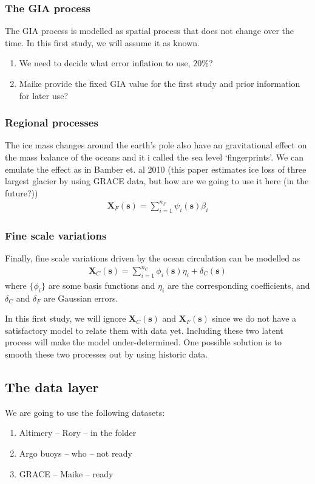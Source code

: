 \documentclass[cmbright,fleqn,referee]{envauth}
\newcommand{\bX}{\bm{X}}
\newcommand{\bs}{\bm{s}}
\begin{document}
\subsubsection{The GIA process}
The GIA process is modelled as spatial process that does not change over the time. In this first study, we will assume it as known. 
\begin{enumerate}
\item We need to decide what error inflation to use, $20\%$?
\item Maike provide the fixed GIA value for the first study and prior information for later use?
\end{enumerate}

\subsubsection{Regional processes}
The ice mass changes around the earth's pole also have an gravitational effect on the mass balance of the oceans and it i called the sea level `fingerprints'. We can emulate the effect as in Bamber et. al 2010 (this paper estimates ice loss of three largest glacier by using GRACE data, but how are we going to use it here (in the future?))
\begin{align}
\bX_{F}(\bs) = \sum_{i=1}^{n_F} \psi_i(\bs)\beta_i
\end{align}


\subsubsection{Fine scale variations}
Finally, fine scale variations driven by the ocean circulation can be modelled as 
\begin{align}
\bX_{C}(\bs) = \sum_{i=1}^{n_C} \phi_i(\bs)\eta_i + \delta_{C}(\bs)
\end{align}
where $\{\phi_i\}$ are some basis functions and $\eta_i$ are the corresponding coefficients, and $\delta_C$ and $\delta_F$ are Gaussian errors.

In this first study, we will ignore $\bX_C(\bs)$ and $\bX_F(\bs)$ since we do not have a satisfactory model to relate them with data yet. Including these two latent process will make the model under-determined. One possible solution is to smooth these two processes out by using historic data. 



\subsection{The data layer}
We are going to use the following datasets:
\begin{enumerate}
\item Altimery -- Rory -- in the folder
\item Argo buoys -- who -- not ready
\item GRACE -- Maike -- ready
\end{enumerate}
\end{document}
